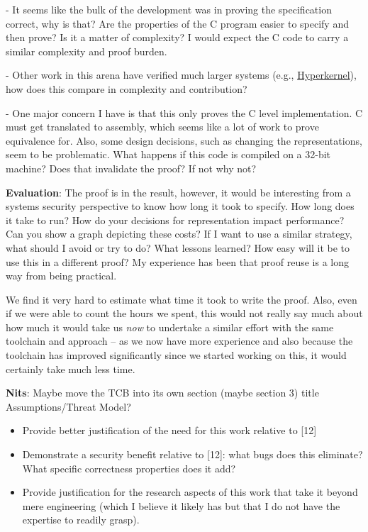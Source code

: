 - It seems like the bulk of the development was in proving the specification correct, why is that? Are the properties of the C program easier to specify and then prove? Is it a matter of complexity? I would expect the C code to carry a similar complexity and proof burden.

- Other work in this arena have verified much larger systems (e.g., \href{https://unsat.cs.washington.edu/papers/nelson-hyperkernel.pdf}{Hyperkernel}), how does this compare in complexity and contribution?

- One major concern I have is that this only proves the C level implementation. C must get translated to assembly, which seems like a lot of work to prove equivalence for. Also, some design decisions, such as changing the representations, seem to be problematic. What happens if this code is compiled on a 32-bit machine? Does that invalidate the proof? If not why not?

\textbf{Evaluation}: The proof is in the result, however, it would be interesting from a systems security perspective to know how long it took to specify. How long does it take to run? How do your decisions for representation impact performance? Can you show a graph depicting these costs? If I want to use a similar strategy, what should I avoid or try to do? What lessons learned? How easy will it be to use this in a different proof? My experience has been that proof reuse is a long way from being practical.
\begin{answer}
  We find it very hard to estimate what time it took to write the proof. 
  Also, even if we were able to count the hours we spent, this would not really say much about
  how much it would take us \emph{now} to undertake a similar effort with the same toolchain
  and approach -- as we now have more experience and also because the toolchain has improved
  significantly since we started working on this, it would certainly take much less time.
\end{answer}

\textbf{Nits}: Maybe move the TCB into its own section (maybe section 3) title Assumptions/Threat Model?

\begin{center}
\end{center}

\begin{itemize}
    \item Provide better justification of the need for this work relative to [12]
    \item Demonstrate a security benefit relative to [12]: what bugs does this eliminate? What specific correctness properties does it add?
    \item Provide justification for the research aspects of this work that take it beyond mere engineering (which I believe it likely has but that I do not have the expertise to readily grasp).
\end{itemize}

